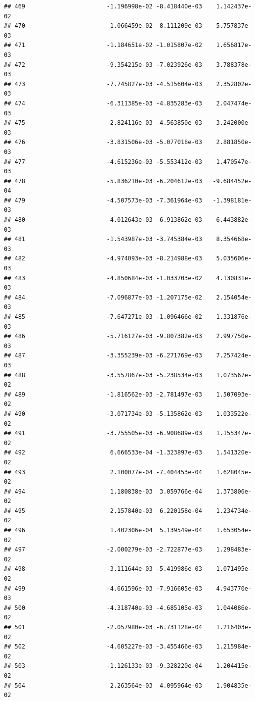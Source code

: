 \documentclass[
]{article}
\begin{document}
\begin{verbatim}
## 469                       -1.196998e-02 -8.418440e-03    1.142437e-02
## 470                       -1.066459e-02 -8.111209e-03    5.757837e-03
## 471                       -1.184651e-02 -1.015807e-02    1.656817e-03
## 472                       -9.354215e-03 -7.023926e-03    3.788378e-03
## 473                       -7.745827e-03 -4.515604e-03    2.352802e-03
## 474                       -6.311385e-03 -4.835283e-03    2.047474e-03
## 475                       -2.824116e-03 -4.563850e-03    3.242000e-03
## 476                       -3.831506e-03 -5.077018e-03    2.881850e-03
## 477                       -4.615236e-03 -5.553412e-03    1.470547e-03
## 478                       -5.836210e-03 -6.204612e-03   -9.684452e-04
## 479                       -4.507573e-03 -7.361964e-03   -1.398181e-03
## 480                       -4.012643e-03 -6.913862e-03    6.443882e-03
## 481                       -1.543987e-03 -3.745384e-03    8.354668e-03
## 482                       -4.974093e-03 -8.214988e-03    5.035606e-03
## 483                       -4.850684e-03 -1.033703e-02    4.130831e-03
## 484                       -7.096877e-03 -1.207175e-02    2.154054e-03
## 485                       -7.647271e-03 -1.096466e-02    1.331876e-03
## 486                       -5.716127e-03 -9.807382e-03    2.997750e-03
## 487                       -3.355239e-03 -6.271769e-03    7.257424e-03
## 488                       -3.557867e-03 -5.238534e-03    1.073567e-02
## 489                       -1.816562e-03 -2.781497e-03    1.507093e-02
## 490                       -3.071734e-03 -5.135862e-03    1.033522e-02
## 491                       -3.755505e-03 -6.908689e-03    1.155347e-02
## 492                        6.666533e-04 -1.323897e-03    1.541320e-02
## 493                        2.100077e-04 -7.404453e-04    1.628045e-02
## 494                        1.180838e-03  3.059766e-04    1.373806e-02
## 495                        2.157840e-03  6.220158e-04    1.234734e-02
## 496                        1.402306e-04  5.139549e-04    1.653054e-02
## 497                       -2.000279e-03 -2.722877e-03    1.298483e-02
## 498                       -3.111644e-03 -5.419986e-03    1.071495e-02
## 499                       -4.661596e-03 -7.916605e-03    4.943770e-03
## 500                       -4.318740e-03 -4.685105e-03    1.044086e-02
## 501                       -2.057980e-03 -6.731128e-04    1.216403e-02
## 502                       -4.605227e-03 -3.455466e-03    1.215984e-02
## 503                       -1.126133e-03 -9.328220e-04    1.204415e-02
## 504                        2.263564e-03  4.095964e-03    1.904835e-02

\end{verbatim}
\end{document}
